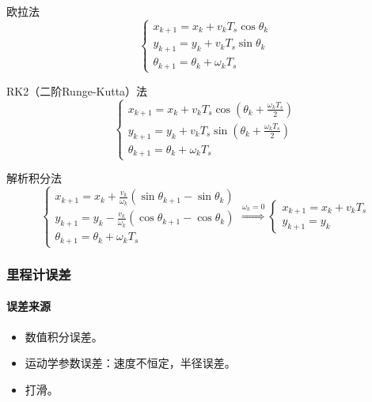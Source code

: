 \documentclass[
12pt, %
a4paper, 
oneside, %
headinclude,footinclude, %
]{scrartcl}
\begin{document}
\begin{itemize}
\begin{minipage}{0.5\textwidth}
\item 欧拉法
$$ \begin{cases} x_{k + 1} = x_k + v_k T_s \cos \theta_k \\ y_{k + 1} = y_k + v_k T_s \sin \theta_k \\ \theta_{k + 1} = \theta_k + \omega_k T_s \end{cases} $$
\end{minipage}
\begin{minipage}{0.5\textwidth}
\item RK2（二阶Runge-Kutta）法
$$ \begin{cases} x_{k + 1} = x_k + v_k T_s \cos(\theta_k + \frac{\omega_k T_s}{2}) \\ y_{k + 1} = y_k + v_k T_s \sin(\theta_k + \frac{\omega_k T_s}{2}) \\ \theta_{k + 1} = \theta_k + \omega_k T_s \end{cases} $$
\end{minipage}
\item 解析积分法
$$ 
\begin{cases} x_{k + 1} = x_k + \frac{v_k}{\omega_k} (\sin \theta_{k + 1} - \sin \theta_k) \\ y_{k + 1} = y_k - \frac{v_k}{\omega_k} (\cos \theta_{k + 1} - \cos \theta_k) \\ \theta_{k + 1} = \theta_k + \omega_k T_s \end{cases} 
\overset{\omega_k = 0}{\Longrightarrow}
\begin{cases} x_{k + 1} = x_k + v_k T_s \\ y_{k + 1} = y_k \end{cases}  
$$
\end{itemize}
\subsubsection[里程计误差]{里程计误差}
\paragraph{误差来源}
\begin{itemize}
\item 数值积分误差。
\item 运动学参数误差：速度不恒定，半径误差。
\item 打滑。
\end{itemize}
\end{document}
